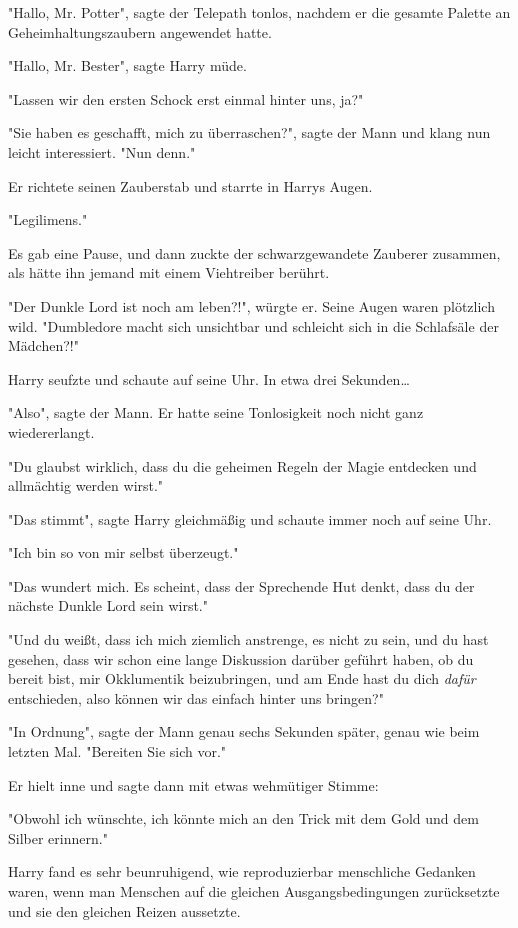 {"Hallo, Mr. Potter", sagte der Telepath tonlos, nachdem er die gesamte Palette an Geheimhaltungszaubern angewendet hatte.

"Hallo, Mr. Bester", sagte Harry müde.

"Lassen wir den ersten Schock erst einmal hinter uns, ja?"

"Sie haben es geschafft, mich zu überraschen?", sagte der Mann und klang nun leicht interessiert. "Nun denn."

Er richtete seinen Zauberstab und starrte in Harrys Augen.

"Legilimens."

Es gab eine Pause, und dann zuckte der schwarzgewandete Zauberer zusammen, als hätte ihn jemand mit einem Viehtreiber berührt.

"Der Dunkle Lord ist noch am leben?!", würgte er. Seine Augen waren plötzlich wild. "Dumbledore macht sich unsichtbar und schleicht sich in die Schlafsäle der Mädchen?!"

Harry seufzte und schaute auf seine Uhr. In etwa drei Sekunden…

"Also", sagte der Mann. Er hatte seine Tonlosigkeit noch nicht ganz wiedererlangt.

"Du glaubst wirklich, dass du die geheimen Regeln der Magie entdecken und allmächtig werden wirst."

"Das stimmt", sagte Harry gleichmäßig und schaute immer noch auf seine Uhr.

"Ich bin so von mir selbst überzeugt."

"Das wundert mich. Es scheint, dass der Sprechende Hut denkt, dass du der nächste Dunkle Lord sein wirst."

"Und du weißt, dass ich mich ziemlich anstrenge, es nicht zu sein, und du hast gesehen, dass wir schon eine lange Diskussion darüber geführt haben, ob du bereit bist, mir Okklumentik beizubringen, und am Ende hast du dich \emph{dafür} entschieden, also können wir das einfach hinter uns bringen?"

"In Ordnung", sagte der Mann genau sechs Sekunden später, genau wie beim letzten Mal. "Bereiten Sie sich vor."

Er hielt inne und sagte dann mit etwas wehmütiger Stimme:

"Obwohl ich wünschte, ich könnte mich an den Trick mit dem Gold und dem Silber erinnern."

Harry fand es sehr beunruhigend, wie reproduzierbar menschliche Gedanken waren, wenn man Menschen auf die gleichen Ausgangsbedingungen zurücksetzte und sie den gleichen Reizen aussetzte.

}
